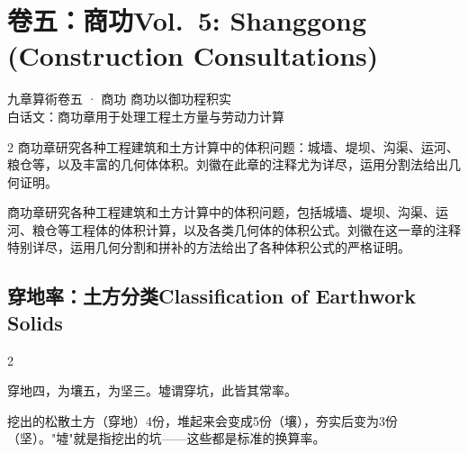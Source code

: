 \documentclass[11pt,a4paper]{article}
\newcommand{\bilingualsection}[2]{%
  \section{#1\hfill\normalfont\large\color{sectioncolor}#2}%
}
\newcommand{\bilingualsubsection}[2]{%
  \subsection{#1\hfill\normalfont\normalsize\color{sectioncolor}#2}%
}
\begin{document}
\newpage

\bilingualsection{卷五：商功}{Vol.\ 5: Shanggong (Construction Consultations)}

\begin{volumeheader}{九章算術卷五 · 商功}
商功以御功程积实\\[0.3em]
\small 白话文：商功章用于处理工程土方量与劳动力计算
\end{volumeheader}

\vspace{0.5cm}

\begin{paracol}{2}
商功章研究各种工程建筑和土方计算中的体积问题：城墙、堤坝、沟渠、运河、粮仓等，以及丰富的几何体体积。刘徽在此章的注释尤为详尽，运用分割法给出几何证明。

\switchcolumn

商功章研究各种工程建筑和土方计算中的体积问题，包括城墙、堤坝、沟渠、运河、粮仓等工程体的体积计算，以及各类几何体的体积公式。刘徽在这一章的注释特别详尽，运用几何分割和拼补的方法给出了各种体积公式的严格证明。

\end{paracol}

\vspace{0.5cm}

\bilingualsubsection{穿地率：土方分类}{Classification of Earthwork Solids}

\begin{paracol}{2}

\begin{methodbox}
穿地四，为壤五，为坚三。墟谓穿坑，此皆其常率。
\end{methodbox}

\switchcolumn

\begin{methodbox}
挖出的松散土方（穿地）4份，堆起来会变成5份（壤），夯实后变为3份（坚）。"墟"就是指挖出的坑——这些都是标准的换算率。
\end{methodbox}

\end{paracol}

\vspace{0.2cm}
\end{document}
